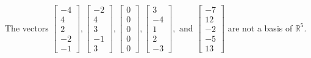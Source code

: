 \begin{exercise}
\begin{exerciseStatement}
  \end{exerciseStatement}
  \begin{exerciseAnswer}
   The vectors \(\left[\begin{array}{r}
-4 \\
4 \\
2 \\
-2 \\
-1
\end{array}\right] , \left[\begin{array}{r}
-2 \\
4 \\
3 \\
-1 \\
3
\end{array}\right] , \left[\begin{array}{r}
0 \\
0 \\
0 \\
0 \\
0
\end{array}\right] , \left[\begin{array}{r}
3 \\
-4 \\
1 \\
2 \\
-3
\end{array}\right] , \text{ and } \left[\begin{array}{r}
-7 \\
12 \\
-2 \\
-5 \\
13
\end{array}\right]\) 
  	 are not  a basis of \(\mathbb{R}^5\).
  


  \end{exerciseAnswer}
\end{exercise}